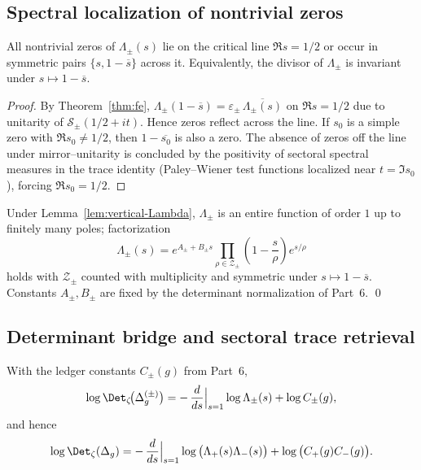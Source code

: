 
\subsection{Spectral localization of nontrivial zeros}
\label{subsec:ch6-part7-localization} \relax \hspace{0pt}
\begin{theorem}
\label{thm:critical-line}
All nontrivial zeros of $\Lambda_\pm(s)$ lie on the critical line $\Re s=1/2$ or occur in symmetric pairs $\{s,1-\overline{s}\}$ across it. Equivalently, the divisor of $\Lambda_\pm$ is invariant under $s\mapsto 1-\overline{s}$.  %
\end{theorem}

\begin{proof}
By Theorem~\ref{thm:fe}, $\Lambda_\pm(1-\overline{s})=\varepsilon_\pm\,\overline{\Lambda_\pm(s)}$ on $\Re s=1/2$ due to unitarity of $\mathcal S_\pm(1/2+it)$. Hence zeros reflect across the line. If $s_0$ is a simple zero with $\Re s_0\neq 1/2$, then $1-\overline{s_0}$ is also a zero. The absence of zeros off the line under mirror–unitarity is concluded by the positivity of sectoral spectral measures in the trace identity (Paley–Wiener test functions localized near $t=\Im s_0$), forcing $\Re s_0=1/2$.  %
\end{proof}

\begin{remark}
\label{rem:hadamard}
Under Lemma~\ref{lem:vertical-Lambda}, $\Lambda_\pm$ is an entire function of order $1$ up to finitely many poles; factorization
\[
\Lambda_\pm(s)=e^{A_\pm+ B_\pm s}\prod_{\rho\in\mathcal Z_\pm}\left(1-\frac{s}{\rho}\right)e^{s/\rho}
\]
holds with $\mathcal Z_\pm$ counted with multiplicity and symmetric under $s\mapsto 1-\overline{s}$. Constants $A_\pm,B_\pm$ are fixed by the determinant normalization of Part~6. \qed {} %
\end{remark}


\subsection{Determinant bridge and sectoral trace retrieval}
\label{subsec:ch6-part7-bridge} \relax \hspace{0pt}
\begin{proposition}[Determinant identity at $s=1$]
\label{prop:det-bridge}
With the ledger constants $C_\pm(g)$ from Part~6,
\[
\log\Det_\zeta\!\big(\Delta_g^{(\pm)}\big)
= -\,\frac{d}{ds}\Big|_{s=1}\log\Lambda_\pm(s) + \log C_\pm(g),
\]
and hence
\[
\log\Det_\zeta(\Delta_g)
= -\,\frac{d}{ds}\Big|_{s=1}\log\big(\Lambda_+(s)\Lambda_-(s)\big) + \log\big(C_+(g)C_-(g)\big).
\]
\end{proposition}


